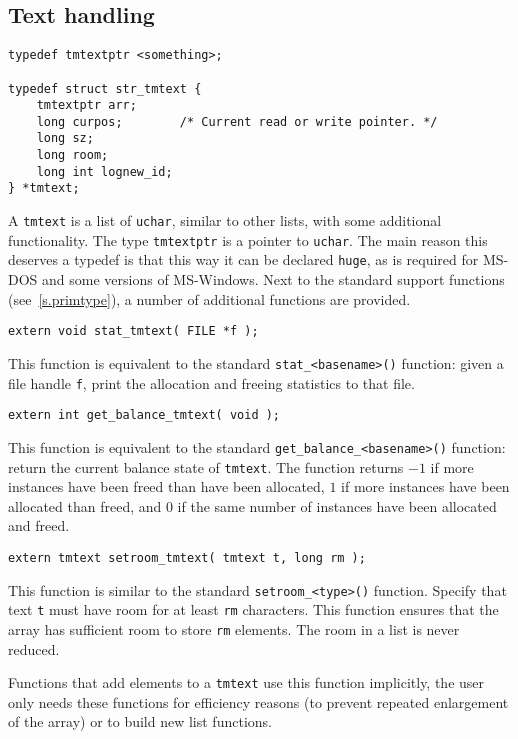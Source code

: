 \subsection{Text handling}
\label{s.tmtext}
\begin{verbatim}
typedef tmtextptr <something>;

typedef struct str_tmtext {
    tmtextptr arr;
    long curpos;        /* Current read or write pointer. */
    long sz;
    long room;
    long int lognew_id;
} *tmtext;
\end{verbatim}
\par
A \verb'tmtext' is a list of \verb'uchar', similar to other
lists, with some additional functionality. The type \verb'tmtextptr' is a
pointer to \verb'uchar'.
The main reason this deserves a typedef is that this way it can be declared
\verb'huge', as is required for MS-DOS and some versions of MS-Windows.
Next to the standard support functions (see~\ref{s.primtype}),
a number of additional functions are provided.
\begin{verbatim}
extern void stat_tmtext( FILE *f );
\end{verbatim}
\begin{desc}
This function is equivalent to the standard \verb'stat_<basename>()' function:
given a file handle \verb'f', print the allocation and freeing statistics
to that file.
\end{desc}
\begin{verbatim}
extern int get_balance_tmtext( void );
\end{verbatim}
\begin{desc}
This function is equivalent to the standard \verb'get_balance_<basename>()'
function: return the current balance state of \verb'tmtext'. 
The function returns $-1$ if more instances have been freed than have
been allocated, $1$ if more instances have been allocated than freed,
and $0$ if the same number of instances have been allocated and freed.
\end{desc}
\begin{verbatim}
extern tmtext setroom_tmtext( tmtext t, long rm );
\end{verbatim}
\begin{desc}
This function is similar to the standard \verb'setroom_<type>()'
function.
Specify that text {\tt t} must have room for at least {\tt rm} characters.
This function ensures that the array has sufficient room to
store {\tt rm} elements.
The room in a list is never reduced.
\par
Functions that add elements to a \verb'tmtext' use this function implicitly,
the user only needs these functions for efficiency reasons
(to prevent repeated enlargement of the array)
or to build new list functions.
\end{desc}

